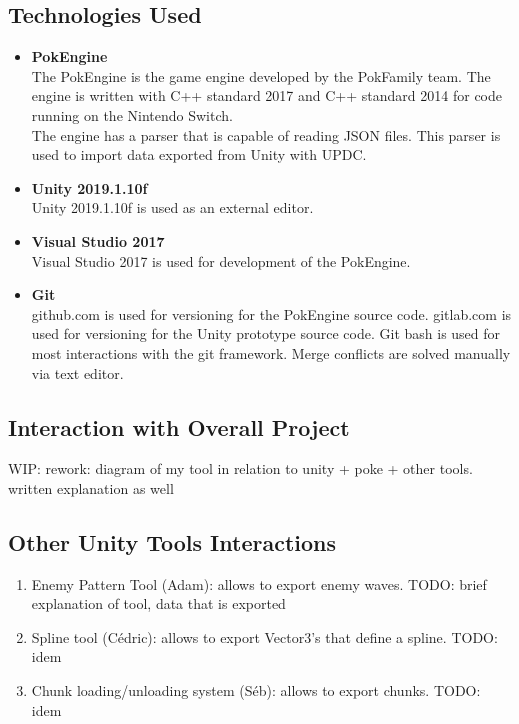 \documentclass[12pt,a4paper]{article}
\begin{document}
\subsection{Technologies Used}
\begin{itemize}
	\item \textbf{PokEngine}\\
		The PokEngine is the game engine developed by the PokFamily team. The engine is written with C++ standard 2017 and C++ standard 2014 for code running on the Nintendo Switch.\\
The engine has a parser that is capable of reading JSON files. This parser is used to import data exported from Unity with UPDC.

	\item \textbf{Unity 2019.1.10f}\\
		Unity 2019.1.10f is used as an external editor.
	
	\item \textbf{Visual Studio 2017}\\
		Visual Studio 2017 is used for development of the PokEngine.
	
	\item \textbf{Git}\\
		github.com is used for versioning for the PokEngine source code. gitlab.com is used for versioning for the Unity prototype source code. Git bash is used for most interactions with the git framework. Merge conflicts are solved manually via text editor.
		
\end{itemize}

\subsection{Interaction with Overall Project}
WIP: rework: diagram of my tool in relation to unity + poke + other tools. written explanation as well

\subsection{Other Unity Tools Interactions}
\begin{enumerate}
\item Enemy Pattern Tool (Adam): allows to export enemy waves. TODO: brief explanation of tool, data that is exported
\item Spline tool (Cédric): allows to export Vector3's that define a spline. TODO: idem
\item Chunk loading/unloading system (Séb): allows to export chunks. TODO: idem
\end{enumerate}
\end{document}
